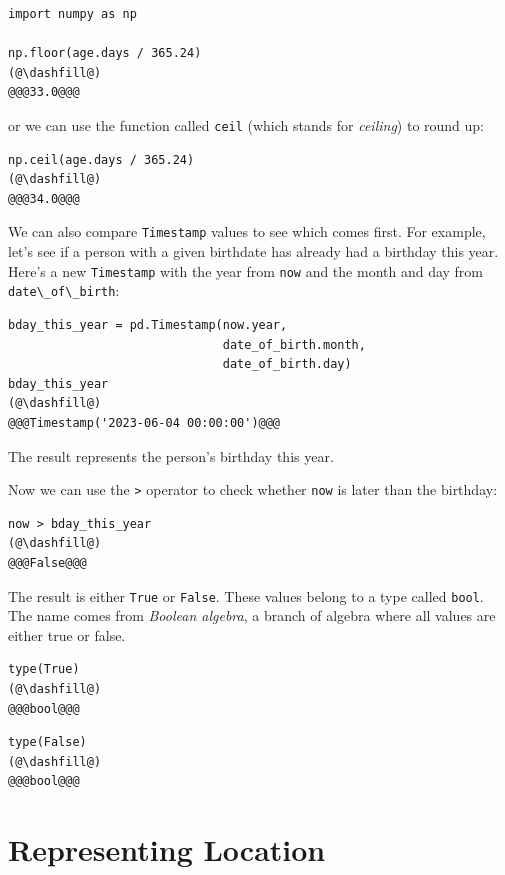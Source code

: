 \begin{lstlisting}[]
import numpy as np

np.floor(age.days / 365.24)
(@\dashfill@)
@@@33.0@@@
\end{lstlisting}
or we can use the function called \passthrough{\lstinline!ceil!} (which stands for
\emph{ceiling}) to round up:

\begin{lstlisting}[]
np.ceil(age.days / 365.24)
(@\dashfill@)
@@@34.0@@@
\end{lstlisting}

We can also compare \passthrough{\lstinline!Timestamp!} values to see
which comes first. For example, let's see if a person with a given
birthdate has already had a birthday this year. Here's a new
\passthrough{\lstinline!Timestamp!} with the year from
\passthrough{\lstinline!now!} and the month and day from
\passthrough{\lstinline!date\_of\_birth!}:

\begin{lstlisting}[]
bday_this_year = pd.Timestamp(now.year, 
                              date_of_birth.month, 
                              date_of_birth.day)
bday_this_year
(@\dashfill@)
@@@Timestamp('2023-06-04 00:00:00')@@@
\end{lstlisting}
The result represents the person's birthday this year. 

Now we can use
the \passthrough{\lstinline!>!} operator to check whether
\passthrough{\lstinline!now!} is later than the birthday:

\begin{lstlisting}[]
now > bday_this_year
(@\dashfill@)
@@@False@@@
\end{lstlisting}
The result is either \passthrough{\lstinline!True!} or
\passthrough{\lstinline!False!}. These values belong to a type called
\passthrough{\lstinline!bool!}. The name comes from \emph{Boolean algebra},
a branch of algebra where all values are either true or false.

\begin{lstlisting}[]
type(True)
(@\dashfill@)
@@@bool@@@
\end{lstlisting}

\begin{lstlisting}[]
type(False)
(@\dashfill@)
@@@bool@@@
\end{lstlisting}

\hypertarget{representing-location}{%
\section{Representing Location}\label{representing-location}}

